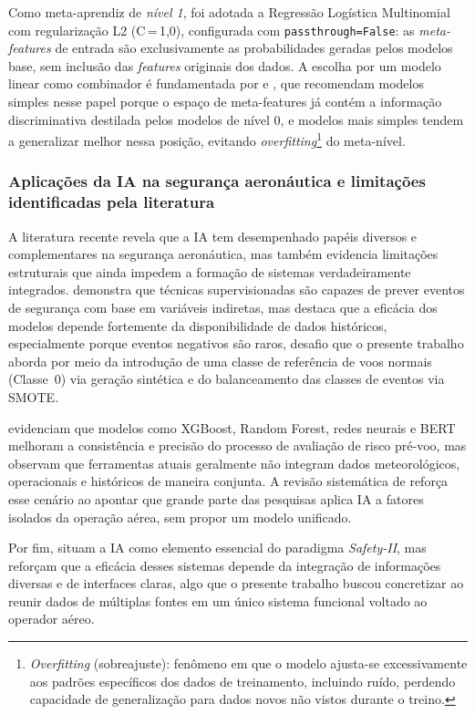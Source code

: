 \documentclass[english,brazilian]{UNISINOSartigo}
\begin{document}
Como meta-aprendiz de \textit{nível 1}, foi adotada a Regressão Logística
Multinomial com regularização L2 (C\,=\,1,0), configurada com
\texttt{passthrough=False}: as \textit{meta-features} de entrada são
exclusivamente as probabilidades geradas pelos modelos base, sem inclusão
das \textit{features} originais dos dados. A escolha por um modelo linear como
combinador é fundamentada por  e ,
que recomendam modelos simples nesse papel porque o espaço de meta-features já
contém a informação discriminativa destilada pelos modelos de nível 0, e modelos
mais simples tendem a generalizar melhor nessa posição, evitando
\textit{overfitting}\footnote{\textit{Overfitting} (sobreajuste): fenômeno em
que o modelo ajusta-se excessivamente aos padrões específicos dos dados de
treinamento, incluindo ruído, perdendo capacidade de generalização para dados
novos não vistos durante o treino.} do meta-nível.

\subsubsection{Aplicações da IA na segurança aeronáutica e limitações identificadas
pela literatura}

A literatura recente revela que a IA tem desempenhado papéis diversos e
complementares na segurança aeronáutica, mas também evidencia limitações
estruturais que ainda impedem a formação de sistemas verdadeiramente integrados.
 demonstra que técnicas supervisionadas são capazes de
prever eventos de segurança com base em variáveis indiretas, mas destaca que a
eficácia dos modelos depende fortemente da disponibilidade de dados históricos,
especialmente porque eventos negativos são raros, desafio que o presente
trabalho aborda por meio da introdução de uma classe de referência de voos
normais (Classe~0) via geração sintética e do balanceamento das classes de
eventos via SMOTE.

 evidenciam que modelos como XGBoost, Random Forest,
redes neurais e BERT melhoram a consistência e precisão do processo de avaliação
de risco pré-voo, mas observam que ferramentas atuais geralmente não integram
dados meteorológicos, operacionais e históricos de maneira conjunta. A revisão
sistemática de  reforça esse cenário ao apontar que grande
parte das pesquisas aplica IA a fatores isolados da operação aérea, sem propor um
modelo unificado.

Por fim,  situam a IA como elemento essencial do
paradigma \textit{Safety-II}, mas reforçam que a eficácia desses sistemas depende
da integração de informações diversas e de interfaces claras, algo que o presente
trabalho buscou concretizar ao reunir dados de múltiplas fontes em um único
sistema funcional voltado ao operador aéreo.
\end{document}
